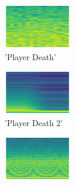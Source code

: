 \begin{figure}[H]
{
    \begin{subfigure}{0.23\textwidth}
      \includegraphics[width=3cm]{sounds/buttons/01.wav-button.png}%
      \caption*{'Player Death'}
    \end{subfigure}
    \begin{subfigure}{0.23\textwidth}
      \includegraphics[width=3cm]{sounds/buttons/02.wav-button.png}%
      \caption*{'Player Death 2'}
    \end{subfigure}
    \begin{subfigure}{0.23\textwidth}
      \includegraphics[width=3cm]{sounds/buttons/03.wav-button.png}%
\end{subfigure}}
\end{figure}
